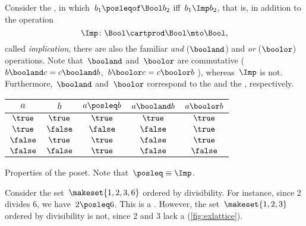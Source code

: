 \begin{example}
    Consider the  \Bool, in which~$b_1 \posleqof\Bool b_2$ iff~$b_1 \Imp b_2$, that is, in addition to the operation
    \begin{equation}
        \Imp\colon\Bool\cartprod \Bool\mto\Bool,
    \end{equation}
    called \emph{implication}, there are also the familiar \emph{and} ($\booland$) and \emph{or} ($\boolor$) operations.
    Note that~$\booland$ and~$\boolor$ are commutative ($b\booland c = c\booland b$,~$b\boolor c = c\boolor b$ ), whereas~$\Imp$ is not.
    Furthermore,~$\booland$ and~$\boolor$ correspond to the  and the , respectively.

    \begin{margintable}
        \centering
        \begin{tabular}{cc|ccc}
            $a$      & $b$      & $a \posleq  b$ & $a \booland b$ & $a \boolor b$ \\ \hline
            $\true$  & $\true$  & $\true$        & $\true$        & $\true$ \\
            $\true$  & $\false$ & $\false$       & $\false$       & $\true$ \\
            $\false$ & $\true$  & $\true$        & $\false$       & $\true$ \\
            $\false$ & $\false$ & $\true$        & $\false$       & $\false$
        \end{tabular}
        \caption{Properties of the \Bool poset.
            Note that~$\posleq \equiv \Imp$.
        }
        \label{tab:boolposet}
    \end{margintable}
\end{example}

\begin{example}
    Consider the set~$\makeset{1,2,3,6}$ ordered by divisibility.
    For instance, since 2 divides 6, we have~$2\posleq 6$.
    This is a .
    However, the set~$\makeset{1,2,3}$ ordered by divisibility is not, since 2 and 3 lack a  (\cref{fig:exlattice}).
\end{example}

